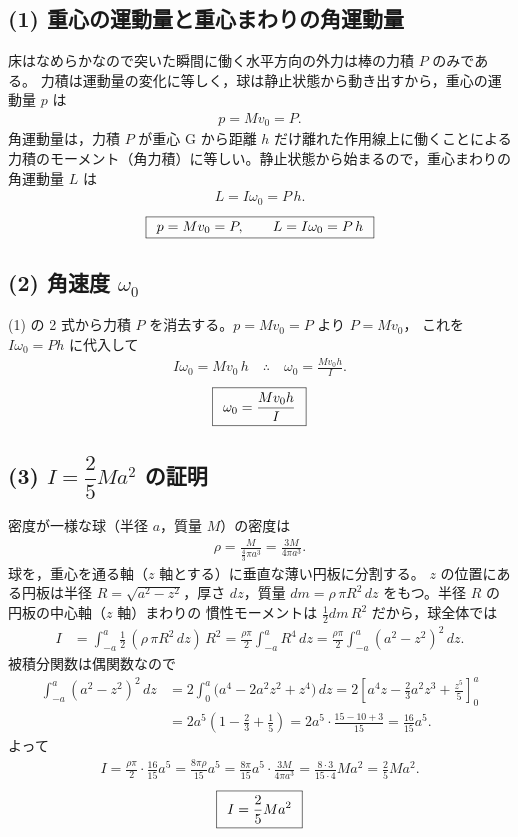 \documentclass[11pt,a4paper]{article}
\begin{document}
\subsection*{(1) 重心の運動量と重心まわりの角運動量}
床はなめらかなので突いた瞬間に働く水平方向の外力は棒の力積 $P$ のみである。
力積は運動量の変化に等しく，球は静止状態から動き出すから，重心の運動量 $p$ は
\begin{align*}
  p = M v_0 = P.
\end{align*}
角運動量は，力積 $P$ が重心 G から距離 $h$ だけ離れた作用線上に働くことによる
力積のモーメント（角力積）に等しい。静止状態から始まるので，重心まわりの
角運動量 $L$ は
\begin{align*}
  L = I\omega_0 = P\,h.
\end{align*}
\[
  \boxed{\,\;p = M v_0 = P,\qquad L = I\omega_0 = P\,h\;\,}
\]

\subsection*{(2) 角速度 $\omega_0$}
(1) の 2 式から力積 $P$ を消去する。$p=Mv_0=P$ より $P=Mv_0$，
これを $I\omega_0=Ph$ に代入して
\begin{align*}
  I\omega_0 = M v_0\,h
  \quad\therefore\quad
  \omega_0 = \frac{M v_0 h}{I}.
\end{align*}
\[
  \boxed{\,\;\omega_0=\dfrac{M v_0 h}{I}\;\,}
\]

\subsection*{(3) $I=\dfrac{2}{5}Ma^2$ の証明}
密度が一様な球（半径 $a$，質量 $M$）の密度は
\begin{align*}
  \rho=\frac{M}{\frac{4}{3}\pi a^3}=\frac{3M}{4\pi a^3}.
\end{align*}
球を，重心を通る軸（$z$ 軸とする）に垂直な薄い円板に分割する。
$z$ の位置にある円板は半径 $R=\sqrt{a^2-z^2}$，厚さ $dz$，質量
$dm=\rho\,\pi R^2\,dz$ をもつ。半径 $R$ の円板の中心軸（$z$ 軸）まわりの
慣性モーメントは $\tfrac12 dm\,R^2$ だから，球全体では
\begin{align*}
  I &= \int_{-a}^{a}\frac12\,(\rho\,\pi R^2\,dz)\,R^2
     = \frac{\rho\pi}{2}\int_{-a}^{a}R^4\,dz
     = \frac{\rho\pi}{2}\int_{-a}^{a}(a^2-z^2)^2\,dz.
\end{align*}
被積分関数は偶関数なので
\begin{align*}
  \int_{-a}^{a}(a^2-z^2)^2\,dz
  &= 2\int_{0}^{a}\!\bigl(a^4-2a^2z^2+z^4\bigr)\,dz
   = 2\!\left[a^4 z-\frac{2}{3}a^2 z^3+\frac{z^5}{5}\right]_{0}^{a}\\
  &= 2a^5\!\left(1-\frac{2}{3}+\frac{1}{5}\right)
   = 2a^5\cdot\frac{15-10+3}{15}
   = \frac{16}{15}a^5.
\end{align*}
よって
\begin{align*}
  I = \frac{\rho\pi}{2}\cdot\frac{16}{15}a^5
    = \frac{8\pi\rho}{15}a^5
    = \frac{8\pi}{15}a^5\cdot\frac{3M}{4\pi a^3}
    = \frac{8\cdot 3}{15\cdot 4}M a^2
    = \frac{2}{5}M a^2.
\end{align*}
\[
  \boxed{\,\;I=\dfrac{2}{5}M a^2\;\,}
\]
\end{document}

